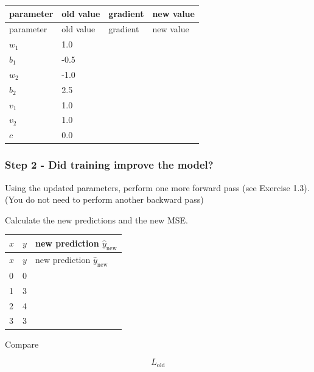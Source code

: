 \documentclass[10pt]{article}
\begin{document}
\begingroup
\small
\setlength{\tabcolsep}{4pt}
\begin{longtable}{l|l|l|l}
parameter & old value & gradient & new value \\[1.5pt]
\hline
\endfirsthead
parameter & old value & gradient & new value \\[1.5pt]
\hline
\endhead
\rule{0pt}{2.4ex}$w_1$ & 1.0 &  $\phantom{-0.00}$ &  $\phantom{-0.00}$ \\[3pt]
\rule{0pt}{2.4ex}$b_1$ & -0.5 &  $\phantom{-0.00}$ &  $\phantom{-0.00}$ \\[3pt]
\rule{0pt}{2.4ex}$w_2$ & -1.0 &  $\phantom{-0.00}$ &  $\phantom{-0.00}$ \\[3pt]
\rule{0pt}{2.4ex}$b_2$ & 2.5 &  $\phantom{-0.00}$ &  $\phantom{-0.00}$ \\[3pt]
\rule{0pt}{2.4ex}$v_1$ & 1.0 &  $\phantom{-0.00}$ &  $\phantom{-0.00}$ \\[3pt]
\rule{0pt}{2.4ex}$v_2$ & 1.0 &  $\phantom{-0.00}$ &  $\phantom{-0.00}$ \\[3pt]
\rule{0pt}{2.4ex}$c$ & 0.0 &  $\phantom{-0.00}$ &  $\phantom{-0.00}$ \\[3pt]
\end{longtable}
\endgroup
\subsubsection*{Step 2 - Did training improve the model?}
Using the updated parameters, perform one more forward pass (see Exercise 1.3). (You do not need to perform another backward pass)

Calculate the new predictions and the new MSE.

\begingroup
\small
\setlength{\tabcolsep}{4pt}
\begin{longtable}{l|l|l}
$x$ & $y$ & new prediction $\hat y_{\mathrm{new}}$ \\[1.5pt]
\hline
\endfirsthead
$x$ & $y$ & new prediction $\hat y_{\mathrm{new}}$ \\[1.5pt]
\hline
\endhead
\rule{0pt}{2.4ex}0 & 0 &  $\phantom{-0.00}$ \\[3pt]
\rule{0pt}{2.4ex}1 & 3 &  $\phantom{-0.00}$ \\[3pt]
\rule{0pt}{2.4ex}2 & 4 &  $\phantom{-0.00}$ \\[3pt]
\rule{0pt}{2.4ex}3 & 3 &  $\phantom{-0.00}$ \\[3pt]
\end{longtable}
\endgroup
Compare

\[
L_{\mathrm{old}}
\]
\end{document}
